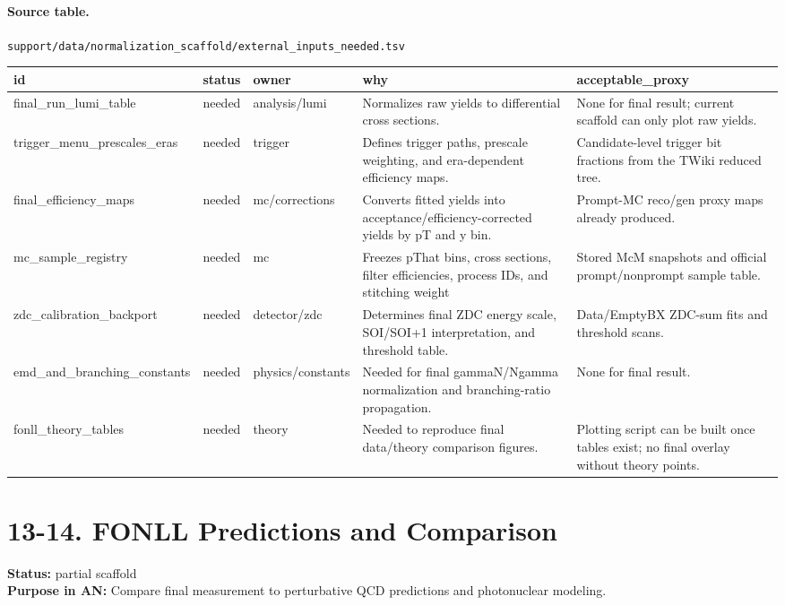 \documentclass[11pt]{article}
\begin{document}
\paragraph{Source table.} \texttt{support/data/normalization\_scaffold/external\_inputs\_needed.tsv}
\begin{center}\scriptsize
\begin{tabular}{|l|l|l|l|l|}
\hline
id & status & owner & why & acceptable\_proxy \\ \hline
final\_run\_lumi\_table & needed & analysis/lumi & Normalizes raw yields to differential cross sections. & None for final result; current scaffold can only plot raw yields. \\ \hline
trigger\_menu\_prescales\_eras & needed & trigger & Defines trigger paths, prescale weighting, and era-dependent efficiency maps. & Candidate-level trigger bit fractions from the TWiki reduced tree. \\ \hline
final\_efficiency\_maps & needed & mc/corrections & Converts fitted yields into acceptance/efficiency-corrected yields by pT and y bin. & Prompt-MC reco/gen proxy maps already produced. \\ \hline
mc\_sample\_registry & needed & mc & Freezes pThat bins, cross sections, filter efficiencies, process IDs, and stitching weight & Stored McM snapshots and official prompt/nonprompt sample table. \\ \hline
zdc\_calibration\_backport & needed & detector/zdc & Determines final ZDC energy scale, SOI/SOI+1 interpretation, and threshold table. & Data/EmptyBX ZDC-sum fits and threshold scans. \\ \hline
emd\_and\_branching\_constants & needed & physics/constants & Needed for final gammaN/Ngamma normalization and branching-ratio propagation. & None for final result. \\ \hline
fonll\_theory\_tables & needed & theory & Needed to reproduce final data/theory comparison figures. & Plotting script can be built once tables exist; no final overlay without theory points. \\ \hline
\end{tabular}
\end{center}
\section*{13-14. FONLL Predictions and Comparison}
\textbf{Status:} partial scaffold\\
\textbf{Purpose in AN:} Compare final measurement to perturbative QCD predictions and photonuclear modeling.
\end{document}
